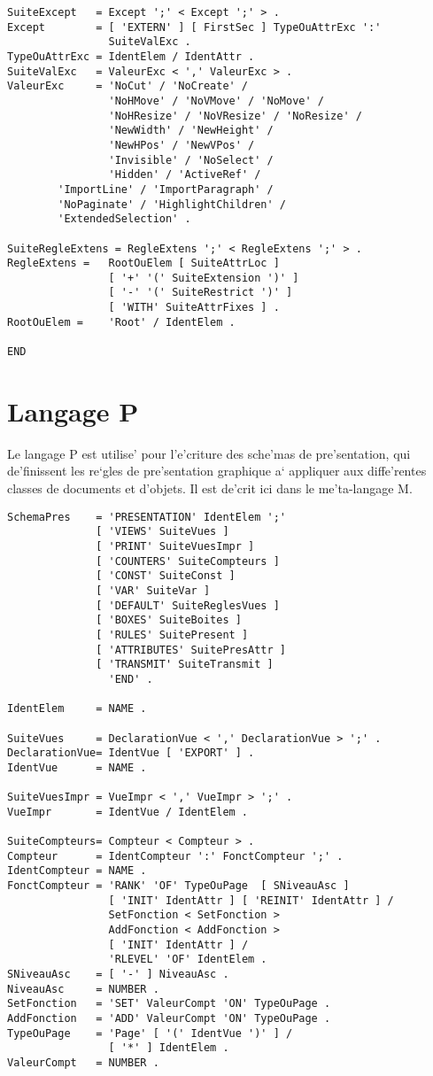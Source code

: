 {\begin{verbatim}
SuiteExcept   = Except ';' < Except ';' > .
Except        = [ 'EXTERN' ] [ FirstSec ] TypeOuAttrExc ':'
                SuiteValExc .
TypeOuAttrExc = IdentElem / IdentAttr .
SuiteValExc   = ValeurExc < ',' ValeurExc > .
ValeurExc     = 'NoCut' / 'NoCreate' /
                'NoHMove' / 'NoVMove' / 'NoMove' /
                'NoHResize' / 'NoVResize' / 'NoResize' /
                'NewWidth' / 'NewHeight' /
                'NewHPos' / 'NewVPos' /
                'Invisible' / 'NoSelect' /
                'Hidden' / 'ActiveRef' /
		'ImportLine' / 'ImportParagraph' /
		'NoPaginate' / 'HighlightChildren' /
		'ExtendedSelection' .

SuiteRegleExtens = RegleExtens ';' < RegleExtens ';' > .
RegleExtens =   RootOuElem [ SuiteAttrLoc ]
                [ '+' '(' SuiteExtension ')' ]
                [ '-' '(' SuiteRestrict ')' ]
                [ 'WITH' SuiteAttrFixes ] .
RootOuElem =    'Root' / IdentElem .

END
\end{verbatim}

\section{Langage P}

Le langage P est utilise' pour l'e'criture des sche'mas de pre'sentation, qui
de'finissent les re`gles de pre'sentation graphique a` appliquer aux diffe'rentes
classes de documents et d'objets. Il est de'crit ici dans le me'ta-langage M.

\begin{verbatim}
SchemaPres    = 'PRESENTATION' IdentElem ';'
              [ 'VIEWS' SuiteVues ]
              [ 'PRINT' SuiteVuesImpr ]
              [ 'COUNTERS' SuiteCompteurs ]
              [ 'CONST' SuiteConst ]
              [ 'VAR' SuiteVar ]
              [ 'DEFAULT' SuiteReglesVues ]
              [ 'BOXES' SuiteBoites ]
              [ 'RULES' SuitePresent ]
              [ 'ATTRIBUTES' SuitePresAttr ]
              [ 'TRANSMIT' SuiteTransmit ]
                'END' .

IdentElem     = NAME .

SuiteVues     = DeclarationVue < ',' DeclarationVue > ';' .
DeclarationVue= IdentVue [ 'EXPORT' ] .
IdentVue      = NAME .

SuiteVuesImpr = VueImpr < ',' VueImpr > ';' .
VueImpr       = IdentVue / IdentElem .

SuiteCompteurs= Compteur < Compteur > .
Compteur      = IdentCompteur ':' FonctCompteur ';' .
IdentCompteur = NAME .
FonctCompteur = 'RANK' 'OF' TypeOuPage  [ SNiveauAsc ]
                [ 'INIT' IdentAttr ] [ 'REINIT' IdentAttr ] /
                SetFonction < SetFonction >
                AddFonction < AddFonction >
                [ 'INIT' IdentAttr ] /
                'RLEVEL' 'OF' IdentElem .
SNiveauAsc    = [ '-' ] NiveauAsc .
NiveauAsc     = NUMBER .
SetFonction   = 'SET' ValeurCompt 'ON' TypeOuPage .
AddFonction   = 'ADD' ValeurCompt 'ON' TypeOuPage .
TypeOuPage    = 'Page' [ '(' IdentVue ')' ] /
                [ '*' ] IdentElem .
ValeurCompt   = NUMBER .


\end{verbatim}}
